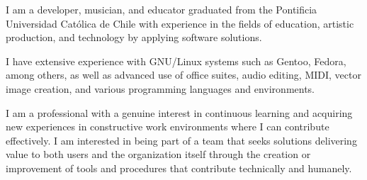 

\begin{cvparagraph}

    I am a developer, musician, and educator graduated from the Pontificia
    Universidad Católica de Chile with experience in the fields of education,
    artistic production, and technology by applying software solutions.

    I have extensive experience with GNU/Linux systems such as Gentoo, Fedora,
    among others, as well as advanced use of office suites, audio editing, MIDI,
    vector image creation, and various programming languages and environments.


    I am a professional with a genuine interest in continuous learning and
    acquiring new experiences in constructive work environments where I can
    contribute effectively. I am interested in being part of a team that seeks
    solutions delivering value to both users and the organization itself through
    the creation or improvement of tools and procedures that contribute
    technically and humanely.

\end{cvparagraph}

